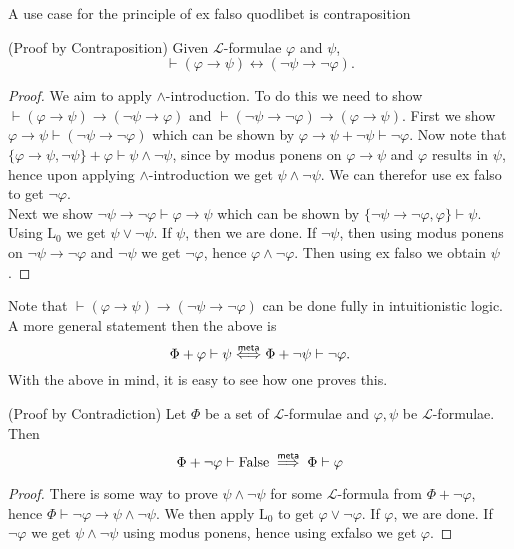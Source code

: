 A use case for the principle of ex falso quodlibet is contraposition
\begin{theorem}(Proof by Contraposition)
    Given $\mathcal{L}$-formulae $\varphi$ and $\psi$,
    $$\vdash (\varphi \to \psi) \leftrightarrow (\neg\psi\to \neg\varphi).$$
\end{theorem}
\begin{proof}
    We aim to apply $\wedge$-introduction. To do this we need to show $\vdash (\varphi\to \psi) \to (\neg \psi\to \varphi)$ and $\vdash (\neg \psi\to \neg \varphi)\to (\varphi\to \psi)$. First we show $\varphi \to \psi \vdash (\neg\psi\to \neg\varphi)$ which can be shown by $\varphi \to \psi + \neg \psi\vdash \neg \varphi$. Now note that $\{\varphi\to \psi,\neg\psi\}+\varphi\vdash \psi\wedge \neg\psi$, since by modus ponens on $\varphi\to\psi$ and $\varphi$ results in $\psi$, hence upon applying $\wedge$-introduction we get $\psi\wedge \neg\psi$. We can therefor use ex falso to get $\neg \varphi$.\\
    Next we show $\neg \psi \to \neg \varphi \vdash \varphi\to \psi$ which can be shown by $\{\neg\psi\to \neg \varphi,\varphi\}\vdash \psi$. Using $\mathrm{L}_0$ we get $\psi\vee \neg\psi$. If $\psi$, then we are done. If $\neg \psi$, then using modus ponens on $\neg\psi\to \neg \varphi$ and $\neg \psi$ we get $\neg \varphi$, hence $\varphi\wedge \neg \varphi$. Then using ex falso we obtain $\psi$.
\end{proof}
\begin{remark}
    Note that $\vdash (\varphi\to \psi)\to (\neg \psi\to \neg \varphi)$ can be done fully in intuitionistic logic. A more general statement then the above is 
    $$\Phi+\varphi \vdash \psi \mathrel{\overset{\mathsf{meta}}{\Longleftrightarrow}} \Phi+\neg\psi\vdash \neg\varphi.$$
    With the above in mind, it is easy to see how one proves this. 
\end{remark}
\begin{theorem}(Proof by Contradiction) Let $\Phi$ be a set of $\mathcal{L}$-formulae and $\varphi,\psi $ be $\mathcal{L}$-formulae. Then 
$$
    \Phi+\neg\varphi \vdash \mathrm{False} \mathrel{\overset{\mathsf{meta}}{\implies}} \Phi \vdash \varphi
$$
\end{theorem}
\begin{proof}
    There is some way to prove $\psi \wedge \neg \psi$ for some $\mathcal{L}$-formula from $\Phi+\neg\varphi$, hence $\Phi\vdash \neg\varphi \to \psi\wedge \neg \psi$. We then apply $\mathrm{L}_0$ to get $\varphi\vee \neg \varphi$. If $\varphi$, we are done. If $\neg\varphi$ we get $\psi\wedge \neg \psi$ using modus ponens, hence using exfalso we get $\varphi$. 
\end{proof}
